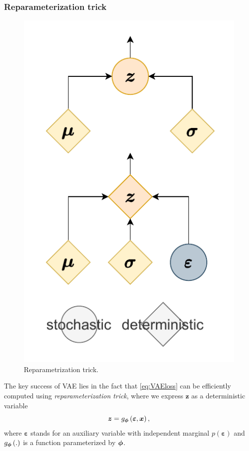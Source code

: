 \subsubsection{Reparameterization trick}
\begin{figure}
  \begin{center}
    \includegraphics[trim={3cm 1.4cm 3cm 2.6cm}]{plots/Images/reparam_resized.pdf}
  \end{center}
  	\caption{Reparametrization trick.}%
	\label{fig:VAE_reparam}%
\end{figure}
The key success of VAE lies in the fact that \eqref{eq:VAEloss} can be efficiently computed using \emph{reparameterization trick}, where we express $\boldsymbol{z}$ as a deterministic variable
\begin{equation}\label{eq:reparam_general}
\boldsymbol{z} = g_{\boldsymbol{\phi}}\left(\boldsymbol{\varepsilon},\boldsymbol{x}\right),
\end{equation}
 where $\boldsymbol{\varepsilon}$ stands for an auxiliary variable with independent marginal $p\left(\boldsymbol{\varepsilon}\right)$ and $g_{\boldsymbol{\phi}}\left(.\right)$ is a function parameterized by $\boldsymbol{\phi}$. 

